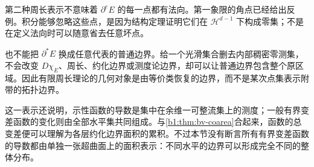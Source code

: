 第二种周长表示不意味着 \(\partial^eE\) 的每一点都有法向。第一象限的角点已经给出反例。积分能够忽略这些点，是因为结构定理证明它们在 \(\mathcal H^{d-1}\) 下构成零集；不是在定义法向时可以随意省去任意坏点。

\ProseParagraphBreak

也不能把 \(\partial^*E\) 换成任意代表的普通边界。给一个光滑集合删去内部稠密零测集，不会改变 \(D\chi_E\)、周长、约化边界或测度论边界，却可以让普通边界包含整个原区域。因此有限周长理论的几何对象是由等价类恢复的边界，而不是某次点集表示附带的拓扑边界。

\ProseParagraphBreak

这一表示还说明，示性函数的导数是集中在余维一可整流集上的测度；一般有界变差函数的变化则由全部水平集共同组成。与\cref{b1:thm:bv-coarea}合起来，函数的总变差便可以理解为各层约化边界面积的累积。不过本节没有断言所有有界变差函数的导数都由单独一张超曲面上的面积表示：不同水平的边界可以形成完全不同的整体分布。
